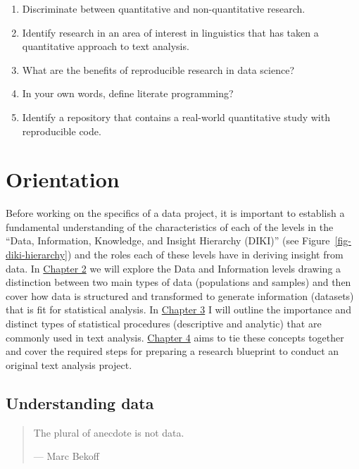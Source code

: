 \documentclass[
  letterpaper,
]{latex/krantz}
\providecommand{\tightlist}{%
  \setlength{\itemsep}{0pt}\setlength{\parskip}{0pt}}\usepackage{longtable,booktabs,array}
\begin{document}
\begin{enumerate}
\def\labelenumi{\arabic{enumi}.}
\tightlist
\item
  Discriminate between quantitative and non-quantitative research.
\item
  Identify research in an area of interest in linguistics that has taken
  a quantitative approach to text analysis.
\item
  What are the benefits of reproducible research in data science?
\item
  In your own words, define literate programming?
\item
  Identify a repository that contains a real-world quantitative study
  with reproducible code.
\end{enumerate}

\part{Orientation}

Before working on the specifics of a data project, it is important to
establish a fundamental understanding of the characteristics of each of
the levels in the ``Data, Information, Knowledge, and Insight Hierarchy
(DIKI)'' (see Figure~\ref{fig-diki-hierarchy}) and the roles each of
these levels have in deriving insight from data. In
\protect\hyperlink{understanding-data-chapter}{Chapter 2} we will
explore the Data and Information levels drawing a distinction between
two main types of data (populations and samples) and then cover how data
is structured and transformed to generate information (datasets) that is
fit for statistical analysis. In
\protect\hyperlink{approaching-analysis-chapter}{Chapter 3} I will
outline the importance and distinct types of statistical procedures
(descriptive and analytic) that are commonly used in text analysis.
\protect\hyperlink{framing-research-chapter}{Chapter 4} aims to tie
these concepts together and cover the required steps for preparing a
research blueprint to conduct an original text analysis project.

\hypertarget{sec-understanding-data}{%
\chapter{Understanding data}\label{sec-understanding-data}}

\begin{quote}
The plural of anecdote is not data.

--- Marc Bekoff
\end{quote}
\end{document}

